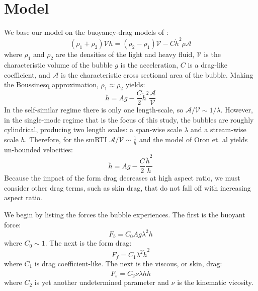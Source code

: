 \section{Model}

We base our model on the buoyancy-drag models of \cite{Oron2001}:
\begin{equation}
(\rho_1 + \rho_2) \mathcal{V} \ddot{h} = (\rho_2 - \rho_1) \mathcal{V} - C \dot{h}^2 \rho \mathcal{A}
\end{equation}
where $\rho_1$ and $\rho_2$ are the densities of the light and heavy fluid,
$\mathcal{V}$ is the characteristic volume of the bubble
$g$ is the acceleration,
$C$ is a drag-like coefficient, and
$\mathcal{A}$ is the characteristic cross sectional area of the bubble.
Making the Boussinesq approximation, $\rho_1 \approx \rho_2$ yields:
\begin{equation}
\ddot{h} = A g - \frac{C}{2} \dot{h}^2 \frac{\mathcal{A}}{\mathcal{V}}
\end{equation}
In the self-similar regime there is only one length-scale, so $\mathcal{A}/\mathcal{V} \sim 1 / \lambda$.
However, in the single-mode regime that is the focus of this study, the bubbles are roughly cylindrical, producing two length scales: a span-wise scale $\lambda$ and a stream-wise scale $h$.
Therefore, for the smRTI $\mathcal{A}/\mathcal{V} \sim \frac{1}{h}$ and the model of Oron et. al yields un-bounded velocities:
\begin{equation}
\ddot{h} = A g - \frac{C}{2} \frac{\dot{h}^2}{h}
\end{equation}
Because the impact of the form drag decreases at high aspect ratio, we must consider other drag terms, such as skin drag, that do not fall off with increasing aspect ratio.

We begin by listing the forces the bubble experiences.  The first is the buoyant force:
\begin{equation}
F_b = C_0 A g \lambda^2 h
\end{equation}
where $C_0 \sim 1$.
The next is the form drag:
\begin{equation}
F_f = C_1 \lambda^2 \dot{h}^2
\end{equation}
where $C_1$ is drag coefficient-like.
The next is the viscous, or skin, drag:
\begin{equation}
F_s = C_2 \nu \lambda h \dot{h}
\end{equation}
where $C_2$ is yet another undetermined parameter and $\nu$ is the kinematic vicosity.


